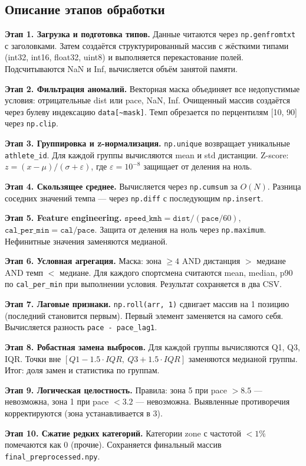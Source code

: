 \documentclass[oneside,a4paper,14pt]{extarticle}
\begin{document}
\normalsize
\newpage
\begin{flushleft}
\section*{Описание этапов обработки}

\textbf{Этап 1. Загрузка и подготовка типов.} Данные читаются через \texttt{np.genfromtxt} с заголовками. Затем создаётся структурированный массив с жёсткими типами (int32, int16, float32, uint8) и выполняется перекастование полей. Подсчитываются NaN и Inf, вычисляется объём занятой памяти.

\textbf{Этап 2. Фильтрация аномалий.} Векторная маска объединяет все недопустимые условия: отрицательные dist или pace, NaN, Inf. Очищенный массив создаётся через булеву индексацию \texttt{data[\textasciitilde mask]}. Темп обрезается по перцентилям [10, 90] через \texttt{np.clip}.

\textbf{Этап 3. Группировка и z-нормализация.} \texttt{np.unique} возвращает уникальные \texttt{athlete\_id}. Для каждой группы вычисляются mean и std дистанции. Z-score: $z = (x - \mu) / (\sigma + \varepsilon)$, где $\varepsilon = 10^{-8}$ защищает от деления на ноль.

\textbf{Этап 4. Скользящее среднее.} Вычисляется через \texttt{np.cumsum} за $O(N)$. Разница соседних значений темпа --- через \texttt{np.diff} с последующим \texttt{np.insert}.

\textbf{Этап 5. Feature engineering.} $\texttt{speed\_kmh} = \texttt{dist} / (\texttt{pace}/60)$, $\texttt{cal\_per\_min} = \texttt{cal} / \texttt{pace}$. Защита от деления на ноль через \texttt{np.maximum}. Нефинитные значения заменяются медианой.

\textbf{Этап 6. Условная агрегация.} Маска: зона $\geq 4$ AND дистанция $>$ медиане AND темп $<$ медиане. Для каждого спортсмена считаются mean, median, p90 по \texttt{cal\_per\_min} при выполнении условия. Результат сохраняется в два CSV.

\textbf{Этап 7. Лаговые признаки.} \texttt{np.roll(arr, 1)} сдвигает массив на 1 позицию (последний становится первым). Первый элемент заменяется на самого себя. Вычисляется разность \texttt{pace - pace\_lag1}.

\textbf{Этап 8. Робастная замена выбросов.} Для каждой группы вычисляются Q1, Q3, IQR. Точки вне $[Q1 - 1.5 \cdot IQR,\ Q3 + 1.5 \cdot IQR]$ заменяются медианой группы. Итог: доля замен и статистика по группам.

\textbf{Этап 9. Логическая целостность.} Правила: зона 5 при pace $> 8.5$ --- невозможна, зона 1 при pace $< 3.2$ --- невозможна. Выявленные противоречия корректируются (зона устанавливается в 3).

\textbf{Этап 10. Сжатие редких категорий.} Категории zone с частотой $< 1\%$ помечаются как 0 (прочие). Сохраняется финальный массив \texttt{final\_preprocessed.npy}.
\end{flushleft}
\end{document}
